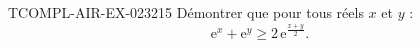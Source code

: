\begin{exercice}{TCOMPL-AIR-EX-023}{2}{15}
Démontrer que pour tous réels $x$ et $y$ :
\[ \mathrm{e}^x + \mathrm{e}^y \geq 2\,\mathrm{e}^{\frac{x+y}{2}}. \]

\end{exercice}

